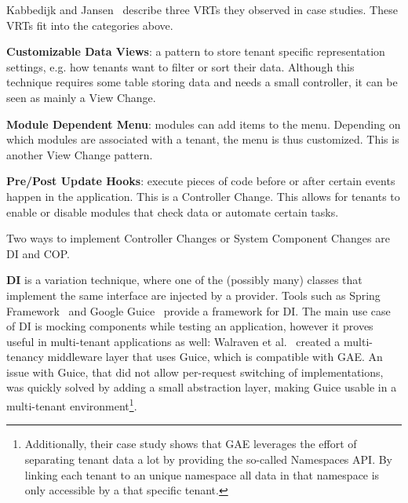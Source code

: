 Kabbedijk and Jansen~\cite{kabbedijk2011variability} describe three \acp{VRT} they observed in case studies. These \acp{VRT}  fit into the categories above.
\begin{compactitem} 
\item \textbf{Customizable Data Views}: a pattern to store tenant specific representation settings, e.g. how tenants want to filter or sort their data. 
Although this technique requires some table storing data and needs a small controller, it can be seen as mainly a View Change.
\item \textbf{Module Dependent Menu}: modules can add items to the menu. Depending on which modules are associated with a tenant, the menu is thus customized. This is another View Change pattern. 
\item \textbf{Pre/Post Update Hooks}: execute pieces of code before or after certain events happen in the application. This is a Controller Change. 
This allows for tenants to enable or disable modules that check data or automate certain tasks.
\end{compactitem}

Two ways to implement Controller Changes or System Component Changes are \acl{DI} and \acl{COP}.

\textbf{\acf{DI}} is a variation technique, where one of the (possibly many) classes that implement the same interface are injected by a provider. Tools such as Spring Framework~\cite{walls2005spring} and Google Guice~\cite{vanbrabant2008google} provide a framework for \ac{DI}. The main use case of \ac{DI} is mocking components while testing an application, however it proves useful in multi-tenant applications as well:
Walraven et al.~\cite{walraven2011middleware} created a multi-tenancy middleware layer that uses Guice, which is compatible with \acf{GAE}. An issue with Guice, that did not allow per-request switching of implementations, was quickly solved by adding a small abstraction layer, making Guice usable in a multi-tenant environment\footnote{
Additionally, their case study shows that \ac{GAE} leverages the effort of separating tenant data a lot by providing the so-called Namespaces API. By linking each tenant to an unique namespace all data in that namespace is only accessible by a that specific tenant.}.

